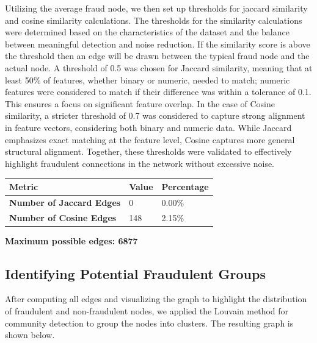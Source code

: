 \documentclass{styles/svproc}
\begin{document}
\bigskip
{}

\bigskip
\noindent Utilizing the average fraud node, we then set up thresholds for jaccard similarity and cosine similarity calculations. The thresholds for the similarity calculations were determined based on the characteristics of the dataset and the balance between meaningful detection and noise reduction. If the similarity score is above the threshold then an edge will be drawn between the typical fraud node and the actual node. A threshold of 0.5 was chosen for Jaccard similarity, meaning that at least 50\% of features, whether binary or numeric, needed to match; numeric features were considered to match if their difference was within a tolerance of 0.1. This ensures a focus on significant feature overlap. In the case of Cosine similarity, a stricter threshold of 0.7 was considered to capture strong alignment in feature vectors, considering both binary and numeric data. While Jaccard emphasizes exact matching at the feature level, Cosine captures more general structural alignment. Together, these thresholds were validated to effectively highlight fraudulent connections in the network without excessive noise.

\bigskip
\noindent
\begin{tabular}{ | m{5cm} | m{2.5cm}| m{3.2cm}|}
  \hline
  \textbf{Metric} & \textbf{Value} & \textbf{Percentage}\\ 
  \hline
  \textbf{Number of Jaccard Edges} & 0 & 0.00\%\\ 
  \hline
  \textbf{Number of Cosine Edges} & 148 & 2.15\%\\ 
  \hline
\end{tabular}

\noindent\textbf{Maximum possible edges: 6877}

\bigskip
{}

\subsection{Identifying Potential Fraudulent Groups}

After computing all edges and visualizing the graph to highlight the distribution of fraudulent and non-fraudulent nodes, we applied the Louvain method for community detection to group the nodes into clusters. The resulting graph is shown below.
\end{document}
